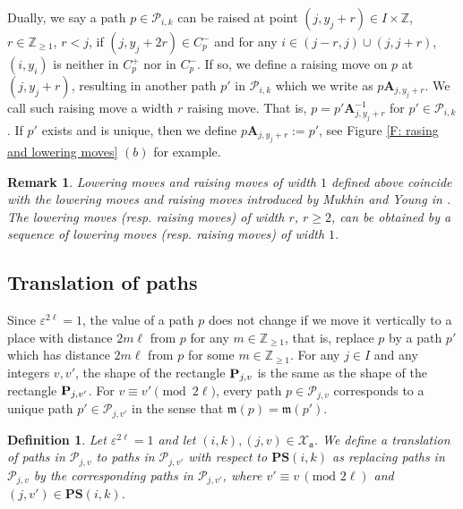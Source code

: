 \documentclass[12pt, reqno]{amsart}
\newtheorem{definition}[theorem]{Definition}
\newtheorem{remark}[theorem]{Remark}
\numberwithin{equation}{section}
\newcommand{\ZZ}{\mathbb{Z}}
\begin{document}
{Dually, we say a path $p\in \mathscr{P}_{i,k}$ can be raised at point $(j,y_j+r)\in I \times \mathbb{Z}$, $r\in \mathbb{Z}_{\geq 1}$, $r<j$, if $(j,y_j+2r)\in C^{-}_{p}$ and for any $i\in{(j-r,j)}\cup{(j,j+r)}$, $(i,y_i)$ is neither in $C^{+}_{p}$ nor in $C^{-}_{p}$. If so, we define a raising move on $p$ at $(j,y_j+r)$, resulting in another path $p'$ in $\mathscr{P}_{i,k}$ which we write as $p\textbf{A}_{j,y_j+r}$. We call such raising move a width $r$ raising move. That is, $p=p'\textbf{A}_{j,y_j+r}^{-1}$ for $p'\in \mathscr P_{i,k}$. If $p'$ exists and is unique, then we define $p\textbf{A}_{j,y_j+r}:=p'$, see Figure \ref{F: rasing and lowering moves} $(b)$ for example.

\begin{remark}
Lowering moves and raising moves of width $1$ defined above coincide with the lowering moves and raising moves introduced by Mukhin and Young in \cite[Section 5]{MY12a}. The lowering moves (resp. raising moves) of width $r$, $r \ge 2$, can be obtained by a sequence of lowering moves (resp. raising moves) of width $1$.
\end{remark}

\subsection{Translation of paths }\label{subsection: translations of paths}

Since $\varepsilon^{2\ell}=1$, the value of a path $p$ does not change if we move it vertically to a place with distance $2m\ell$ from $p$ for any $m \in \ZZ_{\ge 1}$, that is, replace $p$ by a path $p'$ which has distance $2m\ell$ from $p$ for some $m \in \ZZ_{\ge 1}$. For any $j \in I$ and any integers $v, v'$, the shape of the rectangle ${\bf P}_{j,v}$ is the same as the shape of the rectangle ${\bf P}_{j,v'}$. For $v \equiv v' \pmod{2\ell}$, every path $p\in \mathscr{P}_{j,v}$ corresponds to a unique path $p'\in \mathscr{P}_{j,v'}$ in the sense that $\mathfrak{m}(p) = \mathfrak{m}(p')$.
\begin{definition}\label{Def: translation}
Let $\varepsilon^{2 \ell}=1$ and let $(i,k),(j,v)\in \mathcal{X}_{\mathfrak{a}}$. We define a translation of paths in $\mathscr{P}_{j,v}$ to paths in $\mathscr{P}_{j,v'}$ with respect to $\mathbf{PS}(i,k)$ as replacing paths in $\mathscr{P}_{j,v}$ by the corresponding paths in $\mathscr{P}_{j,v'}$, where $v'\equiv v \, (\text{mod } 2 \ell)$ and $(j,v')\in\mathbf{PS}(i,k)$.
\end{definition}



}
\end{document}

